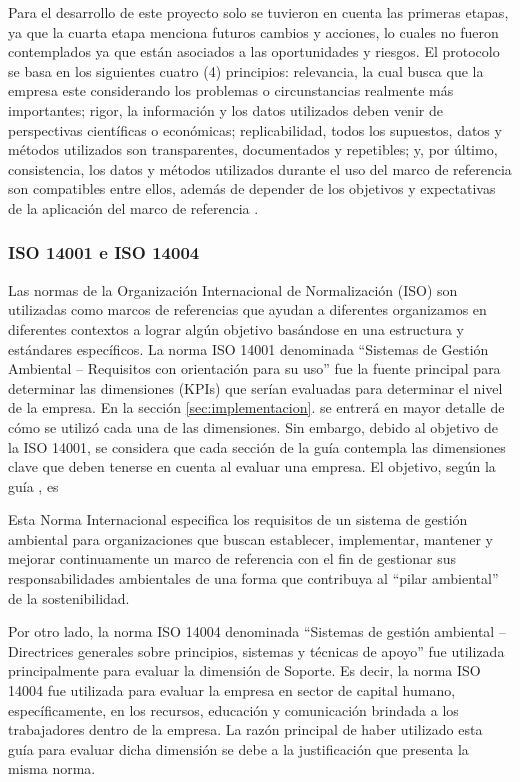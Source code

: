 Para el desarrollo de este proyecto solo se tuvieron en cuenta las primeras etapas, ya que la cuarta etapa menciona futuros cambios y acciones, lo cuales no fueron contemplados ya que están asociados a las oportunidades y riesgos. El protocolo se basa en los siguientes cuatro (4) principios: relevancia, la cual busca que la empresa este considerando los problemas o circunstancias realmente más importantes; rigor, la información y los datos utilizados deben venir de perspectivas científicas o económicas; replicabilidad, todos los supuestos, datos y métodos utilizados son transparentes, documentados y repetibles; y, por último, consistencia, los datos y métodos utilizados durante el uso del marco de referencia son compatibles entre ellos, además de depender de los objetivos y expectativas de la aplicación del marco de referencia \parencite{capitals-coalition-2021}.



\subsubsection{ISO 14001 e ISO 14004}
Las normas de la Organización Internacional de Normalización (ISO) son utilizadas como marcos de referencias que ayudan a diferentes organizamos en diferentes contextos a lograr algún objetivo basándose en una estructura y estándares específicos. La norma ISO 14001 denominada “Sistemas de Gestión Ambiental – Requisitos con orientación para su uso” \parencite{iso-2015} fue la fuente principal para determinar las dimensiones (KPIs) que serían evaluadas para determinar el nivel de la empresa. En la sección \ref{sec:implementacion}.  se entrerá en mayor detalle de cómo se utilizó cada una de las dimensiones. Sin embargo, debido al objetivo de la ISO 14001, se considera que cada sección de la guía contempla las dimensiones clave que deben tenerse en cuenta al evaluar una empresa. El objetivo, según la guía \textcite{iso-2015}, es

\hfill
\par
\leftskip=0.35in \rightskip=0.35in
Esta Norma Internacional especifica los requisitos de un sistema de gestión ambiental para organizaciones que buscan establecer, implementar, mantener y mejorar continuamente un marco de referencia con el fin de gestionar sus responsabilidades ambientales de una forma que contribuya al “pilar ambiental” de la sostenibilidad.

\hfill
\par
\leftskip=0in \rightskip=0in
Por otro lado, la norma  ISO 14004 denominada “Sistemas de gestión ambiental – Directrices generales sobre principios, sistemas y técnicas de apoyo” \parencite{iso-2004} fue utilizada principalmente para evaluar la dimensión de Soporte. Es decir, la norma ISO 14004 fue utilizada para evaluar la empresa en sector de capital humano, específicamente, en los recursos, educación y comunicación brindada a los trabajadores dentro de la empresa. La razón principal de haber utilizado esta guía para evaluar dicha dimensión se debe a la justificación que presenta la misma norma. 

